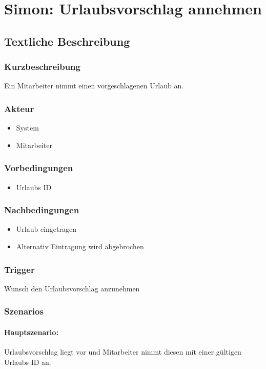 \section{Simon: Urlaubsvorschlag annehmen}

\subsection{Textliche Beschreibung}

\subsubsection{Kurzbeschreibung}
Ein Mitarbeiter nimmt einen vorgeschlagenen Urlaub an.

\subsubsection{Akteur}
\begin{itemize}
	\item System
	\item Mitarbeiter
\end{itemize}

\subsubsection{Vorbedingungen}
\begin{itemize}
	\item Urlaubs ID
\end{itemize}

\subsubsection{Nachbedingungen}
\begin{itemize}
	\item Urlaub eingetragen
	\item Alternativ Eintragung wird abgebrochen
\end{itemize}

\subsubsection{Trigger}
Wunsch den Urlaubsvorschlag anzunehmen

\subsubsection{Szenarios}
\paragraph{Hauptszenario:}
Urlaubsvorschlag liegt vor und Mitarbeiter nimmt diesen mit einer gültigen Urlaubs ID an.

